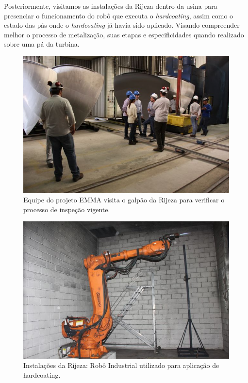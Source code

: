 \documentclass[a4paper,11pt,oneside,openany,brazilian,version=last,draft=false,]{main}
\begin{document}
\begin{twocolumn}
Posteriormente, visitamos as instala\-ções da Rijeza dentro da usina para
presenciar o funcionamento do robô que executa o \textit{hardcoating}, assim como o
estado das pás onde o \textit{hardcoating} já havia sido aplicado. Visando compreender
melhor o processo de metalização, suas etapas e especificidades quando realizado
sobre uma pá da turbina.

\begin{figure}[H]
\centering
\includegraphics[width=\columnwidth]{Fotos/img_4881.jpg}
\caption{Equipe do projeto EMMA visita o galpão da Rijeza para verificar o
processo de inspeção vigente.}
\label{fig:gull}
\end{figure}
\begin{figure}[H]
\centering
\includegraphics[width=\columnwidth]{Fotos/img_4858.jpg}
\caption{Instalações da Rijeza: Robô Industrial utilizado para aplicação de hardcoating.}
\end{figure}


\end{twocolumn}
\end{document}
